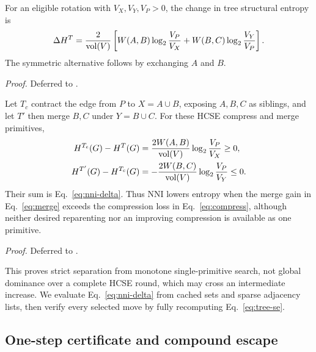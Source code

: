 \begin{theorem}\label{thm:delta}
For an eligible rotation with $V_X,V_Y,V_P>0$, the change in tree structural
entropy is
\begin{equation}
 \Delta H^{T}=
 \frac{2}{\operatorname{vol}(V)}\left[
 W(A,B)\log_2\frac{V_P}{V_X}+
 W(B,C)\log_2\frac{V_Y}{V_P}
 \right].
 \label{eq:nni-delta}
\end{equation}
The symmetric alternative follows by exchanging $A$ and $B$.
\end{theorem}

\emph{Proof.} Deferred to \proofdetails.

\begin{proposition}
\label{prop:atomic}
Let $T_c$ contract the edge from $P$ to $X=A\cup B$, exposing $A,B,C$ as
siblings, and let $T'$ then merge $B,C$ under $Y=B\cup C$. For these HCSE
compress and merge primitives,
\begin{align}
 H^{T_c}(G)-H^T(G)
 &=\frac{2W(A,B)}{\operatorname{vol}(V)}\log_2\frac{V_P}{V_X}\ge0,\label{eq:compress}\\
 H^{T'}(G)-H^{T_c}(G)
 &=-\frac{2W(B,C)}{\operatorname{vol}(V)}\log_2\frac{V_P}{V_Y}\le0.\label{eq:merge}
\end{align}
Their sum is Eq.~\eqref{eq:nni-delta}. Thus NNI lowers entropy when the merge
gain in Eq.~\eqref{eq:merge} exceeds the compression loss in
Eq.~\eqref{eq:compress}, although neither desired reparenting nor an improving
compression is available as one primitive.
\end{proposition}
\emph{Proof.} Deferred to \proofdetails.

This proves strict separation from monotone single-primitive search, not global
dominance over a complete HCSE round, which may cross an intermediate increase.
We evaluate Eq.~\eqref{eq:nni-delta} from cached sets and sparse adjacency lists,
then verify every selected move by fully recomputing Eq.~\eqref{eq:tree-se}.

\subsection{One-step certificate and compound escape}\label{sec:compound-search}
\begin{algorithm}[t]
\caption{Exact NNI refinement of one candidate tree}\label{alg:nni}
\end{algorithm}

